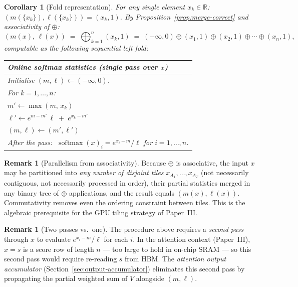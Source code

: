 \documentclass[11pt]{amsart}
\theoremstyle{plain}
\newtheorem{corollary}[theorem]{Corollary}
\theoremstyle{definition}
\newtheorem{remark}[theorem]{Remark}
\newcommand{\R}{\mathbb{R}}
\newcommand{\softmax}{\operatorname{softmax}}
\begin{document}
\begin{corollary}[Fold representation]
\label{cor:online-fold}
For any single element $x_k \in \R$: $(m(\{x_k\}), \ell(\{x_k\})) = (x_k, 1)$.
By Proposition~\ref{prop:merge-correct} and associativity of $\oplus$:
\[
    (m(x),\,\ell(x))
    \;=\;
    \bigoplus_{k=1}^{n} (x_k, 1)
    \;=\;
    (-\infty, 0)
    \oplus (x_1, 1)
    \oplus (x_2, 1)
    \oplus \cdots
    \oplus (x_n, 1),
\]
computable as the following sequential left fold:
\begin{center}
\renewcommand{\arraystretch}{1.2}
\begin{tabular}{l}
\hline
\textbf{Online softmax statistics} (single pass over $x$) \\
\hline
Initialise $(m,\ell) \leftarrow (-\infty, 0)$. \\
For $k = 1, \ldots, n$: \\
\quad $m' \leftarrow \max(m,\, x_k)$ \\
\quad $\ell' \leftarrow e^{m - m'}\,\ell \;+\; e^{x_k - m'}$ \\
\quad $(m, \ell) \leftarrow (m', \ell')$ \\
After the pass: $\;\softmax(x)_i = e^{x_i - m}/\ell$ for $i = 1,\ldots,n$.\\
\hline
\end{tabular}
\end{center}
\end{corollary}

\begin{remark}[Parallelism from associativity]
Because $\oplus$ is associative, the input $x$ may be partitioned into
\emph{any number of disjoint tiles} $x_{A_1}, \ldots, x_{A_T}$
(not necessarily contiguous, not necessarily processed in order), their
partial statistics merged in any binary tree of $\oplus$ applications,
and the result equals $(m(x), \ell(x))$.  Commutativity removes even the
ordering constraint between tiles.  This is the algebraic prerequisite for
the GPU tiling strategy of Paper~III.
\end{remark}

\begin{remark}[Two passes vs.\ one]
The procedure above requires a \emph{second pass} through $x$ to evaluate
$e^{x_i - m}/\ell$ for each $i$.  In the attention context (Paper~III),
$x = s$ is a score row of length $n$ --- too large to hold in on-chip SRAM
--- so this second pass would require re-reading $s$ from HBM.  The
\emph{attention output accumulator} (Section~\ref{sec:output-accumulator})
eliminates this second pass by propagating the partial weighted sum of $V$
alongside $(m, \ell)$.
\end{remark}
\end{document}
